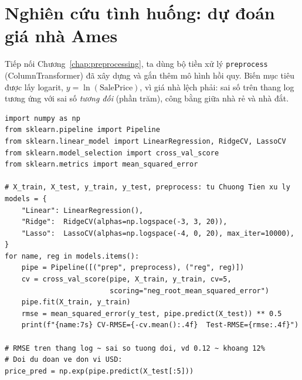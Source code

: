 
\section{Nghiên cứu tình huống: dự đoán giá nhà Ames}

Tiếp nối Chương~\ref{chap:preprocessing}, ta dùng bộ tiền xử lý \texttt{preprocess} (ColumnTransformer) đã xây dựng và gắn thêm mô hình hồi quy. Biến mục tiêu được lấy logarit, $y = \ln(\text{SalePrice})$, vì giá nhà lệch phải: sai số trên thang log tương ứng với sai số \textit{tương đối} (phần trăm), công bằng giữa nhà rẻ và nhà đắt.

\begin{lstlisting}[caption={So sánh Linear Regression, Ridge và Lasso trên Ames Housing}]
import numpy as np
from sklearn.pipeline import Pipeline
from sklearn.linear_model import LinearRegression, RidgeCV, LassoCV
from sklearn.model_selection import cross_val_score
from sklearn.metrics import mean_squared_error

# X_train, X_test, y_train, y_test, preprocess: tu Chuong Tien xu ly
models = {
    "Linear": LinearRegression(),
    "Ridge":  RidgeCV(alphas=np.logspace(-3, 3, 20)),
    "Lasso":  LassoCV(alphas=np.logspace(-4, 0, 20), max_iter=10000),
}
for name, reg in models.items():
    pipe = Pipeline([("prep", preprocess), ("reg", reg)])
    cv = cross_val_score(pipe, X_train, y_train, cv=5,
                         scoring="neg_root_mean_squared_error")
    pipe.fit(X_train, y_train)
    rmse = mean_squared_error(y_test, pipe.predict(X_test)) ** 0.5
    print(f"{name:7s} CV-RMSE={-cv.mean():.4f}  Test-RMSE={rmse:.4f}")

# RMSE tren thang log ~ sai so tuong doi, vd 0.12 ~ khoang 12%
# Doi du doan ve don vi USD:
price_pred = np.exp(pipe.predict(X_test[:5]))
\end{lstlisting}


